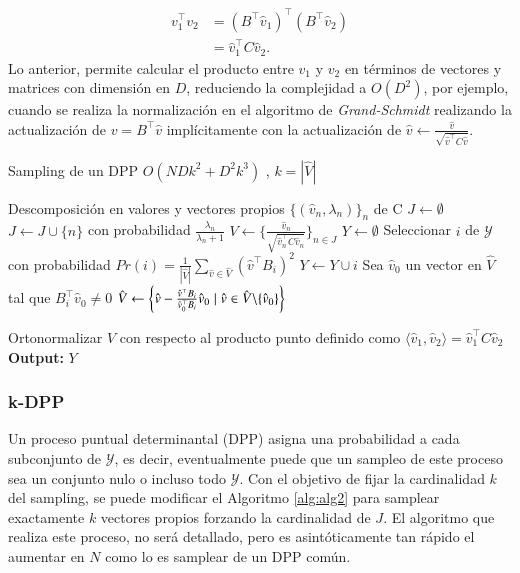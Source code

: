 \begin{align*}
    v_1^{\top}v_2 & = (B^{\top}\hat{v}_1)^{\top}(B^{\top}\hat{v}_2) \\
    & = \hat{v}_1^{\top}C\hat{v}_2.
\end{align*}
Lo anterior, permite calcular el producto entre $v_1$ y $v_2$ en términos de vectores y matrices con dimensión en $D$, reduciendo la complejidad a $O(D^2)$, por ejemplo, cuando se realiza la normalización en el algoritmo de \textit{Grand-Schmidt} realizando la actualización de $v = B^{\top}\hat{v}$ implícitamente con la actualización de $\hat{v} \gets \frac{\hat{v}}{\sqrt{\hat{v}^{\top}C\hat{v}}}$.

\begin{algorithm}
\caption{Sampling de un DPP $O(NDk^2 + D^2k^3)$      , $k = |\hat{V}|$}\label{alg:alg2}
\begin{algorithmic}
\Require Descomposición en valores y vectores propios 
$\{(\hat{v}_n , \lambda_n)\}_{n}$ de C
\State $J \gets \emptyset$
\State $J \gets J \cup \{n\}$ con probabilidad $\frac{\lambda_n}{\lambda_n+1}$
\EndFor
\State $V \gets \{ \frac{\hat{v}_n}{\sqrt{\hat{v}_n^{\top} C \hat{v}_n}} \}_{n \in J}$
\State $Y \gets \emptyset$
\State Seleccionar $i$ de $\mathcal{Y}$ con probabilidad $Pr(i) = \frac{1}{|\hat{V}|}\sum_{\hat{v} \in \hat{V}}(\hat{v}^{\top}B_i)^2$ 
\State $Y \gets Y \cup i$
\State Sea $\hat{v}_0$ un vector en $\hat{V}$ tal que $B_i^{\top}\hat{v}_0 \neq 0$
\State $\hat{V} \gets \left \{\hat{v} - \frac{\hat{v}^{\top}B_i}{\hat{v}_0^{\top}B_i}\hat{v}_0 \hspace{0.1cm}| \hspace{0.1cm} \hat{v} \in \hat{V} \backslash \{\hat{v}_0\} \right \}$

\State Ortonormalizar $\hat{V}$ con respecto al producto punto definido como $\langle \hat{v}_1 , \hat{v}_2 \rangle = \hat{v}_1^{\top}C\hat{v}_2$
\EndWhile   
\State \textbf{Output: } $Y$
\end{algorithmic}
\end{algorithm}

\subsubsection{k-DPP}

Un proceso puntual determinantal (DPP) asigna una probabilidad a cada subconjunto de $\mathcal{Y}$, es decir, eventualmente puede que un sampleo de este proceso sea un conjunto nulo o incluso todo $\mathcal{Y}$. Con el objetivo de fijar la cardinalidad $k$ del sampling, se puede modificar el Algoritmo \ref{alg:alg2} para samplear exactamente $k$ vectores propios forzando la cardinalidad de $J$. 
El algoritmo que realiza este proceso, no será detallado, pero es asintóticamente tan rápido el aumentar en $N$ como lo es samplear de un DPP común. 

